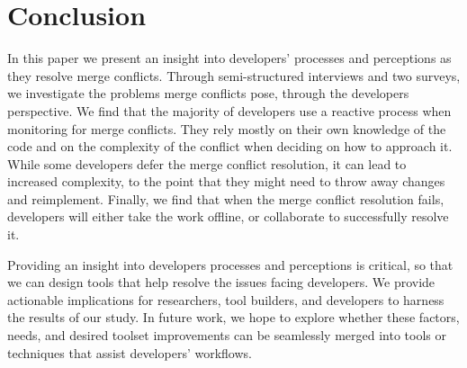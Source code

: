 \section{Conclusion}\label{conclusion}

In this paper we present an insight into developers' processes and perceptions as they resolve merge conflicts.
Through semi-structured interviews and two surveys, we investigate the problems merge conflicts pose, through the developers perspective.
We find that the majority of developers use a reactive process when monitoring for merge conflicts.
They rely mostly on their own knowledge of the code and on the complexity of the conflict when deciding on how to approach it.
While some developers defer the merge conflict resolution, it can lead to increased complexity, to the point that they might need to throw away changes and reimplement.
Finally, we find that when the merge conflict resolution fails, developers will either take the work offline, or collaborate to successfully resolve it. 

Providing an insight into developers processes and perceptions is critical, so that we can design tools that help resolve the issues facing developers.
We provide actionable implications for researchers, tool builders, and developers to harness the results of our study.
In future work, we hope to explore whether these factors, needs, and desired toolset improvements can be seamlessly merged into tools or techniques that assist developers' workflows.

%
%
